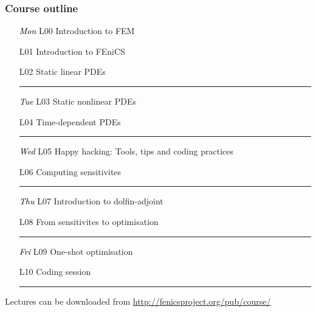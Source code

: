 \documentclass{fenicscourse}
\begin{document}

\begin{frame}
  \frametitle{Course outline}




  \footnotesize

  \hspace{2cm}
  \begin{enumerate}
    \hrule
  \item[\textcolor{black}{\it Mon} L00]
    Introduction to FEM
  \item[L01]
    Introduction to FEniCS
  \item[L02]
    Static linear PDEs
    \\[0.5em]\hrule
  \item[\textcolor{black}{\it Tue} L03]
    Static nonlinear PDEs
  \item[L04]
    Time-dependent PDEs
    \\[0.5em]\hrule
  \item[\textcolor{black}{\it Wed} L05]
    Happy hacking: Tools, tips and coding practices
  \item[L06]
    Computing sensitivites 
    \\[0.5em]\hrule
  \item[\textcolor{black}{\it Thu} L07]
    Introduction to dolfin-adjoint
  \item[L08]
    From sensitivites to optimisation
    \\[0.5em]\hrule
  \item[\textcolor{black}{\it Fri} L09]
    One-shot optimisation
  \item[L10]
    Coding session
    \\[0.5em]\hrule
  \end{enumerate}

  \normalsize

  {\footnotesize Lectures can be downloaded from
    \url{http://fenicsproject.org/pub/course/}}
\end{frame}
\end{document}
